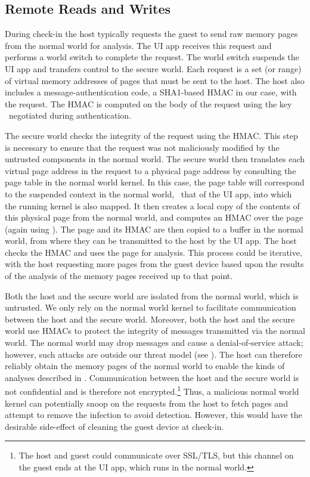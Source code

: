 \subsection{Remote Reads and Writes}
\label{section:mechanism:rmo}

%
During check-in the host typically requests the guest to send raw memory pages
from the normal world for analysis.  The UI app receives this request and
performs a world switch to complete the request.  The world switch suspends the
UI app and transfers control to the secure world.  Each request is a set (or
range) of virtual memory addresses of pages that must be sent to the host.  The
host also includes a message-authentication code, a SHA1-based HMAC in our
case, with the request. The HMAC is computed on the body of the request using
the key \ks\ negotiated during authentication.

The secure world checks the integrity of the request using the HMAC. This step
is necessary to ensure that the request was not maliciously modified by the
untrusted components in the normal world. The secure world then translates each
virtual page address in the request to a physical page address by consulting
the page table in the normal world kernel. In this case, the page table will
correspond to the suspended context in the normal world, \ie~that of the UI
app, into which the running kernel is also mapped.  It then creates a local
copy of the contents of this physical page from the normal world, and computes
an HMAC over the page (again using \ks). The page and its HMAC are then copied
to a buffer in the normal world, from where they can be transmitted to the host
by the UI app.  The host checks the HMAC and uses the page for analysis. This
process could be iterative, with the host requesting more pages from the guest
device based upon the results of the analysis of the memory pages received up
to that point.

Both the host and the secure world are isolated from the normal world, which is
untrusted. We only rely on the normal world kernel to facilitate communication
between the host and the secure world. Moreover, both the host and the secure
world use HMACs to protect the integrity of messages transmitted via the normal
world.  The normal world may drop messages and cause a denial-of-service
attack; however, such attacks are outside our threat model (see
). The host can therefore reliably obtain the memory
pages of the normal world to enable the kinds of analyses described in
. Communication between the host and the secure world
is not confidential and is therefore not encrypted.\footnote{The host and guest
could communicate over SSL/TLS, but this channel on the guest ends at the UI
app, which runs in the normal world.} Thus, a malicious normal world kernel can
potentially snoop on the requests from the host to fetch pages and attempt to
remove the infection to avoid detection. However, this would have the desirable
side-effect of cleaning the guest device at check-in.

